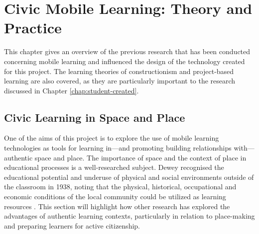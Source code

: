 \chapter{Civic Mobile Learning: Theory and Practice}
\label{chap:MobileLearning}

This chapter gives an overview of the previous research that has been conducted concerning mobile learning and influenced the design of the technology created for this project. The learning theories of constructionism and project-based learning are also covered, as they are particularly important to the research discussed in Chapter \ref{chap:student-created}.

\section{Civic Learning in Space and Place} 

One of the aims of this project is to explore the use of mobile learning technologies as tools for learning in---and promoting building relationships with---authentic space and place. The importance of space and the context of place in educational processes is a well-researched subject. Dewey recognised the educational potential and underuse of physical and social environments outside of the classroom in 1938, noting that the physical, historical, occupational and economic conditions of the local community could be utilized as learning resources \citep{Dewey1938}. This section will highlight how other research has explored the advantages of authentic learning contexts, particularly in relation to place-making and preparing learners for active citizenship. 

